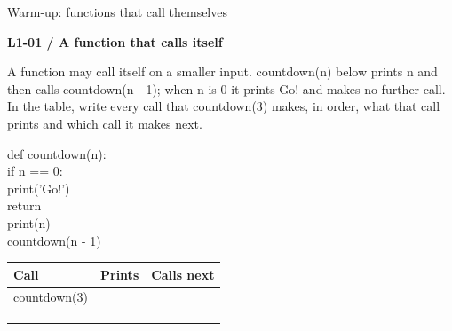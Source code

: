 \documentclass[11pt,a4paper]{article}
\begin{document}
\par\noindent\begin{minipage}{\linewidth}
{\heavy\fontsize{12}{15}\selectfont Warm-up: functions that call themselves\par}\medskip
\textbf{L1-01 / A function that calls itself}\par\smallskip A function may call itself on a smaller input. countdown(n) below prints n and then calls countdown(n - 1); when n is 0 it prints Go! and makes no further call. In the table, write every call that countdown(3) makes, in order, what that call prints and which call it makes next.\par
\par\smallskip\noindent\colorbox{codepaper}{\parbox{\dimexpr\linewidth-2\fboxsep\relax}{\small\ttfamily\raggedright def countdown(n):\\\hspace*{2.4em}if n == 0:\\\hspace*{4.8em}print('Go!')\\\hspace*{4.8em}return\\\hspace*{2.4em}print(n)\\\hspace*{2.4em}countdown(n - 1)}}\par
\par\smallskip \begingroup\small\setlength{\tabcolsep}{4pt}\renewcommand{\arraystretch}{1.35}\begin{tabularx}{\linewidth}{>{\raggedright\arraybackslash}X>{\raggedright\arraybackslash}X>{\raggedright\arraybackslash}X}\toprule\textbf{Call} & \textbf{Prints} & \textbf{Calls next}\\\midrule
countdown(3) &  & \\
 &  & \\
 &  & \\
 &  & \\
\bottomrule\end{tabularx}\endgroup\par\smallskip 
\end{minipage}\par\vspace{2mm}
\end{document}
